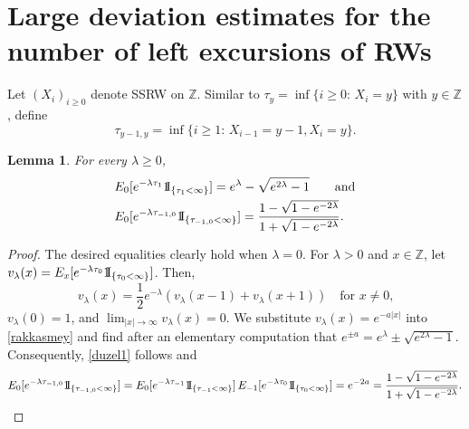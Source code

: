 \documentclass[a4paper]{amsart}
\numberwithin{equation}{section}
\theoremstyle{plain}
\newtheorem{lemma}[theorem]{\sc Lemma}
\theoremstyle{remark}
\begin{document}
\section{Large deviation estimates for the number of left excursions of RWs}\label{app_simple}

Let $(X_i)_{i\ge0}$ denote SSRW on $\mathbb{Z}$. Similar to $\tau_y = \inf\{i\ge 0:\,X_i = y\}$ with $y\in\mathbb{Z}$, define
$$\tau_{y-1,y} = \inf\{i\ge1:\,X_{i-1} = y-1, X_i = y\}.$$ 

\begin{lemma}
	For every $\lambda \ge 0$,
	\begin{align}
	&E_0[e^{-\lambda\tau_1}{{{\rm 1\mkern-1.5mu}\!{\rm I}}}_{\{\tau_1<\infty\}}] = e^\lambda - \sqrt{e^{2\lambda} - 1}\qquad\text{and}\label{duzel1}\\
	&E_0[e^{-\lambda\tau_{-1,0}}{{{\rm 1\mkern-1.5mu}\!{\rm I}}}_{\{\tau_{-1,0}<\infty\}}] = \frac{1 - \sqrt{1 - e^{-2\lambda}}}{1 + \sqrt{1 - e^{-2\lambda}}}.\label{duzel2}
	\end{align}
\end{lemma}

\begin{proof}
	The desired equalities clearly hold when $\lambda=0$. For $\lambda>0$ and $x\in\mathbb{Z}$, let $v_\lambda(x) = E_x[e^{-\lambda\tau_0}{{{\rm 1\mkern-1.5mu}\!{\rm I}}}_{\{\tau_0<\infty\}}]$. Then,
	\begin{equation}\label{rakkasmey}
	v_\lambda(x) = \frac1{2}e^{-\lambda}(v_\lambda(x-1) + v_\lambda(x+1))\quad\text{for $x\ne 0$,}
	\end{equation}
	$v_\lambda(0) = 1$, and $\lim_{|x|\to\infty}v_\lambda(x) = 0$. We substitute $v_\lambda(x) = e^{-a|x|}$ into \eqref{rakkasmey} and find after an elementary computation that $e^{\pm a} = e^\lambda \pm \sqrt{e^{2\lambda} - 1}$.
	Consequently, \eqref{duzel1} follows and
	$$E_0[e^{-\lambda\tau_{-1,0}}{{{\rm 1\mkern-1.5mu}\!{\rm I}}}_{\{\tau_{-1,0}<\infty\}}] = E_0[e^{-\lambda\tau_{-1}}{{{\rm 1\mkern-1.5mu}\!{\rm I}}}_{\{\tau_{-1}<\infty\}}]\,E_{-1}[e^{-\lambda\tau_{0}}{{{\rm 1\mkern-1.5mu}\!{\rm I}}}_{\{\tau_{0}<\infty\}}] = e^{-2a} = \frac{1 - \sqrt{1 - e^{-2\lambda}}}{1 + \sqrt{1 - e^{-2\lambda}}}.\qedhere$$
\end{proof}
\end{document}
